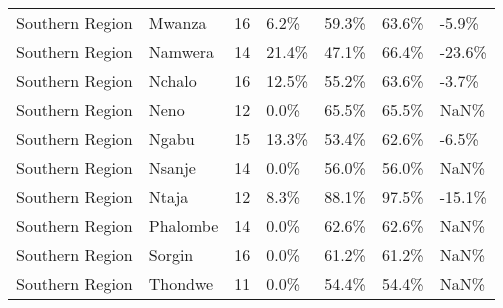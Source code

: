 \begin{table}[ht]
\begin{tabular}{llrllll}
  Southern Region & Mwanza &  16 & 6.2\% & 59.3\% & 63.6\% & -5.9\% \\ 
  Southern Region & Namwera &  14 & 21.4\% & 47.1\% & 66.4\% & -23.6\% \\ 
  Southern Region & Nchalo &  16 & 12.5\% & 55.2\% & 63.6\% & -3.7\% \\ 
  Southern Region & Neno &  12 & 0.0\% & 65.5\% & 65.5\% & NaN\% \\ 
  Southern Region & Ngabu &  15 & 13.3\% & 53.4\% & 62.6\% & -6.5\% \\ 
  Southern Region & Nsanje &  14 & 0.0\% & 56.0\% & 56.0\% & NaN\% \\ 
  Southern Region & Ntaja &  12 & 8.3\% & 88.1\% & 97.5\% & -15.1\% \\ 
  Southern Region & Phalombe &  14 & 0.0\% & 62.6\% & 62.6\% & NaN\% \\ 
  Southern Region & Sorgin &  16 & 0.0\% & 61.2\% & 61.2\% & NaN\% \\ 
  Southern Region & Thondwe &  11 & 0.0\% & 54.4\% & 54.4\% & NaN\% \\ 
   \hline
\end{tabular}
\end{table}
